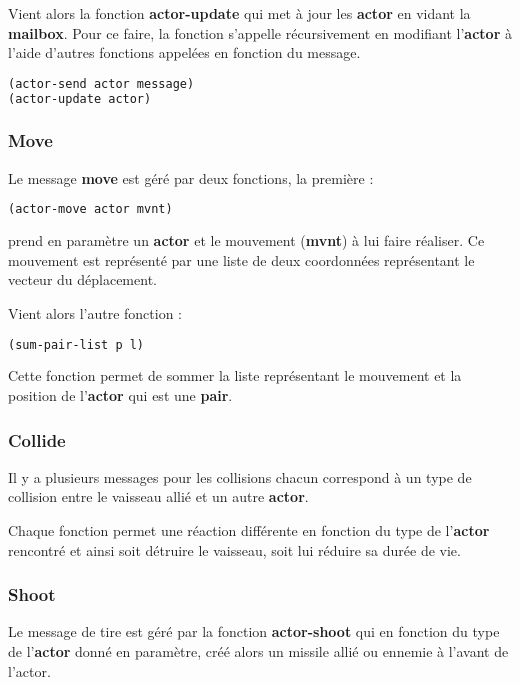 Vient alors la fonction \textbf{actor-update} qui met à jour les \textbf{actor} en vidant la \textbf{mailbox}. Pour ce faire, la fonction s'appelle récursivement en modifiant l'\textbf{actor} à l'aide d'autres fonctions appelées en fonction du message.

\begin{lstlisting}[language={lisp},captionpos=b, frame=single]
(actor-send actor message)
(actor-update actor)
\end{lstlisting}

\subsubsection{Move}
Le message \textbf{move} est géré par deux fonctions, la première :
\begin{lstlisting}[language={lisp},captionpos=b, frame=single]
(actor-move actor mvnt)
\end{lstlisting}
prend en paramètre un \textbf{actor} et le mouvement (\textbf{mvnt}) à lui faire réaliser. Ce mouvement est représenté par une liste de deux coordonnées représentant le vecteur du déplacement.

Vient alors l'autre fonction :
\begin{lstlisting}[language={lisp},captionpos=b, frame=single]
(sum-pair-list p l)
\end{lstlisting}
Cette fonction permet de sommer la liste représentant le mouvement et la position de l'\textbf{actor} qui est une \textbf{pair}.

\subsubsection{Collide}
Il y a plusieurs messages pour les collisions chacun correspond à un type de collision entre le vaisseau allié et un autre \textbf{actor}.

Chaque fonction permet une réaction différente en fonction du type de l'\textbf{actor} rencontré et ainsi soit détruire le vaisseau, soit lui réduire sa durée de vie.

\subsubsection{Shoot}
Le message de tire est géré par la fonction \textbf{actor-shoot} qui en fonction du type de l'\textbf{actor} donné en paramètre, créé alors un missile allié ou ennemie à l'avant de l'actor.
